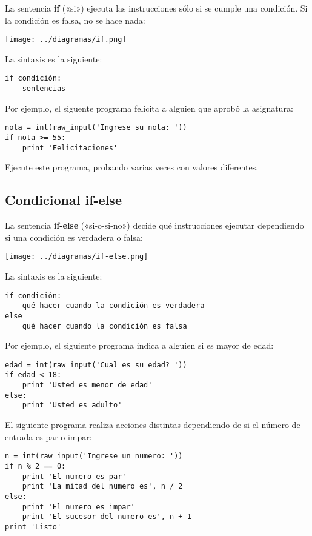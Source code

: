 La sentencia \textbf{if} («si») ejecuta las instrucciones sólo si se
cumple una condición. Si la condición es falsa, no se hace nada:

\texttt{[image: ../diagramas/if.png]}

La sintaxis es la siguiente:

\begin{lstlisting}
if condición:
    sentencias
\end{lstlisting}

Por ejemplo, el siguente programa felicita a alguien que aprobó la
asignatura:

\begin{lstlisting}
nota = int(raw_input('Ingrese su nota: '))
if nota >= 55:
    print 'Felicitaciones'
\end{lstlisting}

Ejecute este programa, probando varias veces con valores diferentes.

\subsection{Condicional if-else}

La sentencia \textbf{if-else} («si-o-si-no») decide qué instrucciones
ejecutar dependiendo si una condición es verdadera o falsa:

\texttt{[image: ../diagramas/if-else.png]}

La sintaxis es la siguiente:

\begin{lstlisting}
if condición:
    qué hacer cuando la condición es verdadera
else
    qué hacer cuando la condición es falsa
\end{lstlisting}

Por ejemplo, el siguiente programa indica a alguien si es mayor de edad:

\begin{lstlisting}
edad = int(raw_input('Cual es su edad? '))
if edad < 18:
    print 'Usted es menor de edad'
else:
    print 'Usted es adulto'
\end{lstlisting}

El siguiente programa realiza acciones distintas dependiendo de si el
número de entrada es par o impar:

\begin{lstlisting}
n = int(raw_input('Ingrese un numero: '))
if n % 2 == 0:
    print 'El numero es par'
    print 'La mitad del numero es', n / 2
else:
    print 'El numero es impar'
    print 'El sucesor del numero es', n + 1
print 'Listo'
\end{lstlisting}

